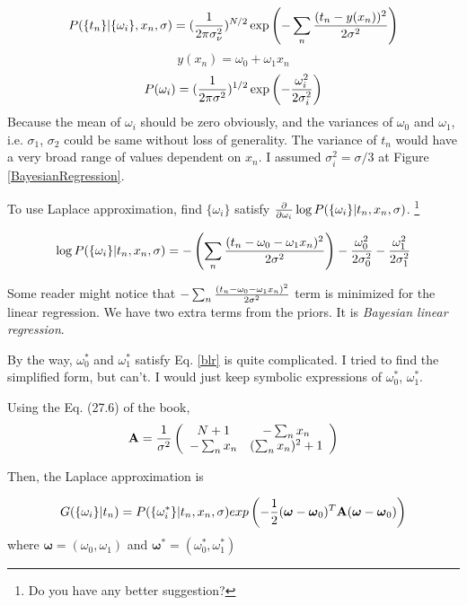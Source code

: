\documentclass[a4paper,11pt]{article}
\newcommand{\vect}[1]{\boldsymbol{\mathbf{#1}}}
\numberwithin{equation}{section}
\begin{document}
{$$
P(\{t_n\}|\{\omega_i\},x_n,\sigma) = ({1 \over 2\pi \sigma^2_{\nu}})^{N/2}  \exp\left(-\sum_n {(t_n-y(x_n))^2 \over 2\sigma^2}\right)
$$
$$
y(x_n)=\omega_0 + \omega_1 x_n
$$
$$
P(\omega_i)=  ({1 \over 2\pi \sigma^2})^{1/2}  \exp\left(-{\omega_i^2 \over 2\sigma_i^2}\right)
$$
Because the mean of $\omega_i$ should be zero obviously, and the variances of $\omega_0$ and $\omega_1$, i.e. $\sigma_1$, $\sigma_2$ could be same without loss of generality. The variance of $t_n$ would have a very broad range of values dependent on $x_n$. I assumed $\sigma_i^2 = \sigma/3$ at Figure \ref{BayesianRegression}.  

To use Laplace approximation, find $\{\omega_i\}$ satisfy ${\partial \over \partial \omega_i}\log P(\{\omega_i\}|t_n,x_n, \sigma)$. \footnote{Do you have any better suggestion?}

\begin{equation}\label{blr}
\log P(\{\omega_i\}|t_n,x_n, \sigma) = -\left(\sum_n {(t_n-\omega_0 - \omega_1 x_n)^2 \over 2\sigma^2}\right)-{\omega_0^2 \over 2\sigma_0^2}-{\omega_1^2 \over 2\sigma_1^2}
\end{equation}

Some reader might notice that $-\sum_n {(t_n-\omega_0 - \omega_1 x_n)^2 \over 2\sigma^2}$ term is minimized for the linear regression. We have two extra terms from the priors. It is {\it Bayesian linear regression}.  

By the way, $\omega_0^*$ and $\omega_1^*$ satisfy Eq. \ref{blr} is quite complicated. I tried to find the simplified form, but can't. I would just keep symbolic expressions of $\omega_0^*$, $\omega_1^*$. 


Using the Eq. (27.6) of the book,
$$
\vect A={1\over \sigma^2}\left(
\begin{array}{ccc}
N+1 & -\sum_n x_n  \\
  -\sum_n x_n  & (\sum_n x_n)^2 + 1 \\
\end{array}
\right)
$$


Then, the Laplace approximation is 

$$
G(\{\omega_i\}|t_n)= P(\{\omega_i^*\}|t_n,x_n, \sigma) exp\left(  -{1 \over 2} (\vect \omega - \vect \omega_0)^T \vect A  (\vect \omega - \vect \omega_0)\right)
$$
where $ \vect \omega  = (\omega_0, \omega_1)$ and $ \vect \omega^*  = (\omega_0^*, \omega_1^*)$


}
\end{document}
